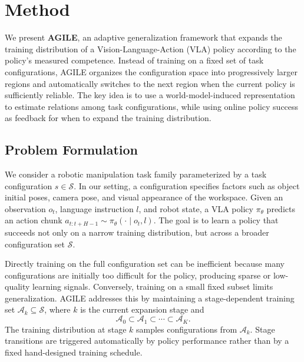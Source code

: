 \section{Method}
\label{sec:method}

We present \textbf{AGILE}, an adaptive generalization framework that expands the
training distribution of a Vision-Language-Action (VLA) policy according to the
policy's measured competence. Instead of training on a fixed set of task
configurations, AGILE organizes the configuration space into progressively
larger regions and automatically switches to the next region when the current
policy is sufficiently reliable. The key idea is to use a world-model-induced
representation to estimate relations among task configurations, while using
online policy success as feedback for when to expand the training distribution.

\subsection{Problem Formulation}
\label{subsec:problem_formulation}

We consider a robotic manipulation task family parameterized by a task
configuration $s \in \mathcal{S}$. In our setting, a configuration specifies
factors such as object initial poses, camera pose, and visual appearance of the
workspace. Given an observation $o_t$, language instruction $l$, and robot state,
a VLA policy $\pi_\theta$ predicts an action chunk
$a_{t:t+H-1} \sim \pi_\theta(\cdot \mid o_t, l)$. The goal is to learn a policy
that succeeds not only on a narrow training distribution, but across a broader
configuration set $\mathcal{S}$.

Directly training on the full configuration set can be inefficient because many
configurations are initially too difficult for the policy, producing sparse or
low-quality learning signals. Conversely, training on a small fixed subset
limits generalization. AGILE addresses this by maintaining a stage-dependent
training set $\mathcal{A}_k \subseteq \mathcal{S}$, where $k$ is the current
expansion stage and
\begin{equation}
    \mathcal{A}_0 \subset \mathcal{A}_1 \subset \cdots \subset \mathcal{A}_K.
\end{equation}
The training distribution at stage $k$ samples configurations from
$\mathcal{A}_k$. Stage transitions are triggered automatically by policy
performance rather than by a fixed hand-designed training schedule.

